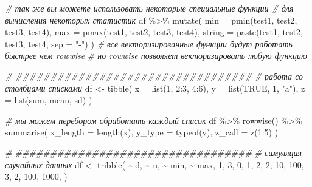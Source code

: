 \documentclass[
]{book}
\newenvironment{Shaded}{\begin{snugshade}}{\end{snugshade}}
\newcommand{\AttributeTok}[1]{\textcolor[rgb]{0.77,0.63,0.00}{#1}}
\newcommand{\CommentTok}[1]{\textcolor[rgb]{0.56,0.35,0.01}{\textit{#1}}}
\newcommand{\ConstantTok}[1]{\textcolor[rgb]{0.00,0.00,0.00}{#1}}
\newcommand{\DecValTok}[1]{\textcolor[rgb]{0.00,0.00,0.81}{#1}}
\newcommand{\FunctionTok}[1]{\textcolor[rgb]{0.00,0.00,0.00}{#1}}
\newcommand{\NormalTok}[1]{#1}
\newcommand{\OtherTok}[1]{\textcolor[rgb]{0.56,0.35,0.01}{#1}}
\newcommand{\SpecialCharTok}[1]{\textcolor[rgb]{0.00,0.00,0.00}{#1}}
\newcommand{\StringTok}[1]{\textcolor[rgb]{0.31,0.60,0.02}{#1}}
\begin{document}
\begin{Shaded}
\begin{Highlighting}[]
\CommentTok{\# так же вы можете использовать некоторые специальные функции}
\CommentTok{\# для вычисления некоторых статистик}
\NormalTok{df }\SpecialCharTok{\%\textgreater{}\%} \FunctionTok{mutate}\NormalTok{(}
  \AttributeTok{min =} \FunctionTok{pmin}\NormalTok{(test1, test2, test3, test4), }
  \AttributeTok{max =} \FunctionTok{pmax}\NormalTok{(test1, test2, test3, test4), }
  \AttributeTok{string =} \FunctionTok{paste}\NormalTok{(test1, test2, test3, test4, }\AttributeTok{sep =} \StringTok{"{-}"}\NormalTok{)}
\NormalTok{)}
\CommentTok{\# все векторизированные функции будут работать быстрее чем rowwise}
\CommentTok{\# но rowwise позволяет векторизировать любую функцию}

\CommentTok{\# \#\#\#\#\#\#\#\#\#\#\#\#\#\#\#\#\#\#\#\#\#\#\#\#\#\#\#\#\#\#\#\#\#\#}
\CommentTok{\# работа со столбцами списками}
\NormalTok{df }\OtherTok{\textless{}{-}} \FunctionTok{tibble}\NormalTok{(}
  \AttributeTok{x =} \FunctionTok{list}\NormalTok{(}\DecValTok{1}\NormalTok{, }\DecValTok{2}\SpecialCharTok{:}\DecValTok{3}\NormalTok{, }\DecValTok{4}\SpecialCharTok{:}\DecValTok{6}\NormalTok{),}
  \AttributeTok{y =} \FunctionTok{list}\NormalTok{(}\ConstantTok{TRUE}\NormalTok{, }\DecValTok{1}\NormalTok{, }\StringTok{"a"}\NormalTok{),}
  \AttributeTok{z =} \FunctionTok{list}\NormalTok{(sum, mean, sd)}
\NormalTok{)}

\CommentTok{\# мы можем перебором обработать каждый список}
\NormalTok{df }\SpecialCharTok{\%\textgreater{}\%} 
  \FunctionTok{rowwise}\NormalTok{() }\SpecialCharTok{\%\textgreater{}\%} 
  \FunctionTok{summarise}\NormalTok{(}
    \AttributeTok{x\_length =} \FunctionTok{length}\NormalTok{(x),}
    \AttributeTok{y\_type =} \FunctionTok{typeof}\NormalTok{(y),}
    \AttributeTok{z\_call =} \FunctionTok{z}\NormalTok{(}\DecValTok{1}\SpecialCharTok{:}\DecValTok{5}\NormalTok{)}
\NormalTok{  )}

\CommentTok{\# \#\#\#\#\#\#\#\#\#\#\#\#\#\#\#\#\#\#\#\#\#\#\#\#\#\#\#\#\#\#\#\#\#\#}
\CommentTok{\# симуляция случайных данных}
\NormalTok{df }\OtherTok{\textless{}{-}} \FunctionTok{tribble}\NormalTok{(}
  \SpecialCharTok{\textasciitilde{}}\NormalTok{id, }\SpecialCharTok{\textasciitilde{}}\NormalTok{ n, }\SpecialCharTok{\textasciitilde{}}\NormalTok{ min, }\SpecialCharTok{\textasciitilde{}}\NormalTok{ max,}
  \DecValTok{1}\NormalTok{,   }\DecValTok{3}\NormalTok{,     }\DecValTok{0}\NormalTok{,     }\DecValTok{1}\NormalTok{,}
  \DecValTok{2}\NormalTok{,   }\DecValTok{2}\NormalTok{,    }\DecValTok{10}\NormalTok{,   }\DecValTok{100}\NormalTok{,}
  \DecValTok{3}\NormalTok{,   }\DecValTok{2}\NormalTok{,   }\DecValTok{100}\NormalTok{,  }\DecValTok{1000}\NormalTok{,}
\NormalTok{)}


\end{Highlighting}
\end{Shaded}
\end{document}
